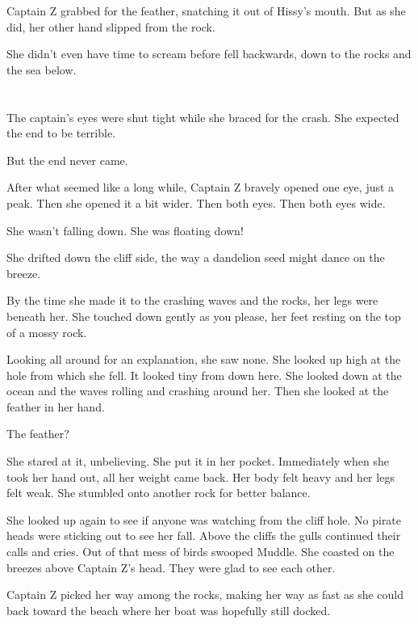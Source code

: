 \documentclass[12pt]{extbook}
\begin{document}
  Captain Z grabbed for the feather, snatching it out of Hissy's mouth.
  But as she did, her other hand slipped from the rock.
  
  She didn't even have time to scream before fell backwards, down to the
  rocks and the sea below.
  
  \section{}\label{section-22}
  
  The captain's eyes were shut tight while she braced for the crash. She
  expected the end to be terrible.
  
  But the end never came.
  
  After what seemed like a long while, Captain Z bravely opened one eye,
  just a peak. Then she opened it a bit wider. Then both eyes. Then both
  eyes wide.
  
  She wasn't falling down. She was floating down!
  
  She drifted down the cliff side, the way a dandelion seed might dance on
  the breeze.
  
  By the time she made it to the crashing waves and the rocks, her legs
  were beneath her. She touched down gently as you please, her feet
  resting on the top of a mossy rock.
  
  Looking all around for an explanation, she saw none. She looked up high
  at the hole from which she fell. It looked tiny from down here. She
  looked down at the ocean and the waves rolling and crashing around her.
  Then she looked at the feather in her hand.
  
  The feather?
  
  She stared at it, unbelieving. She put it in her pocket. Immediately
  when she took her hand out, all her weight came back. Her body felt
  heavy and her legs felt weak. She stumbled onto another rock for better
  balance.
  
  She looked up again to see if anyone was watching from the cliff hole.
  No pirate heads were sticking out to see her fall. Above the cliffs the
  gulls continued their calls and cries. Out of that mess of birds swooped
  Muddle. She coasted on the breezes above Captain Z's head. They were
  glad to see each other.
  
  Captain Z picked her way among the rocks, making her way as fast as she
  could back toward the beach where her boat was hopefully still docked.
  
\end{document}

